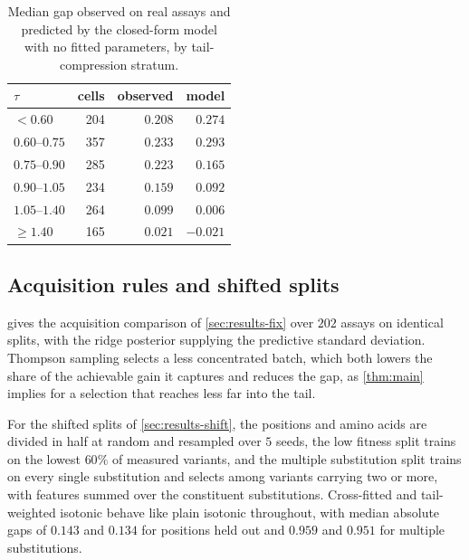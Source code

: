 \documentclass{article}
\theoremstyle{plain}
\theoremstyle{definition}
\begin{document}
\begin{table}[ht]
\caption{Median gap observed on real assays and predicted by the closed-form model with
no fitted parameters, by tail-compression stratum.}
\label{tab:closedform}
\vskip 0.1in
\begin{center}
\begin{small}
\begin{tabular}{lrrr}
\toprule
$\tau$ & cells & observed & model \\
\midrule
$<0.60$        & 204 & $0.208$ & $0.274$ \\
$0.60$--$0.75$ & 357 & $0.233$ & $0.293$ \\
$0.75$--$0.90$ & 285 & $0.223$ & $0.165$ \\
$0.90$--$1.05$ & 234 & $0.159$ & $0.092$ \\
$1.05$--$1.40$ & 264 & $0.099$ & $0.006$ \\
$\ge 1.40$     & 165 & $0.021$ & $-0.021$ \\
\bottomrule
\end{tabular}
\end{small}
\end{center}
\vskip -0.1in
\end{table}

\subsection{Acquisition rules and shifted splits}
\label{app:acq}

 gives the acquisition comparison of \cref{sec:results-fix} over $202$
assays on identical splits, with the ridge posterior supplying the predictive standard
deviation. Thompson sampling selects a less concentrated batch, which both lowers the
share of the achievable gain it captures and reduces the gap, as \cref{thm:main}
implies for a selection that reaches less far into the tail.

For the shifted splits of \cref{sec:results-shift}, the positions and amino acids are
divided in half at random and resampled over $5$ seeds, the low fitness split trains on
the lowest $60\%$ of measured variants, and the multiple substitution split trains on
every single substitution and selects among variants carrying two or more, with
features summed over the constituent substitutions. Cross-fitted and tail-weighted
isotonic behave like plain isotonic throughout, with median absolute gaps of $0.143$
and $0.134$ for positions held out and $0.959$ and $0.951$ for multiple substitutions.
\end{document}
